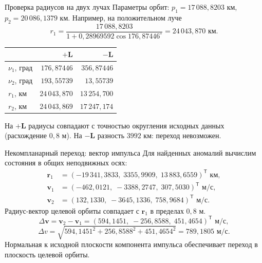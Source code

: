 \documentclass[11pt,aspectratio=169,t]{beamer}
\begin{document}
\begin{frame}{Проверка радиусов на двух лучах}
Параметры орбит:
$p_1=17\,088{,}8203$ км, $p_2=20\,086{,}1379$ км.
Например, на положительном луче
\[
r_1=\frac{17\,088{,}8203}{1+0{,}28969592\cos176{,}87446^\circ}
=24\,043{,}870\text{ км}.
\]
\centering
\renewcommand{\arraystretch}{1.0}
\begin{tabular}{@{}lrr@{}}
\toprule
 & $+\mathbf L$ & $-\mathbf L$\\\midrule
$\nu_1$, град & $176{,}87446$ & $356{,}87446$\\
$\nu_2$, град & $193{,}55739$ & $13{,}55739$\\
$r_1$, км & $24\,043{,}870$ & $13\,254{,}700$\\
$r_2$, км & $24\,043{,}869$ & $17\,247{,}174$\\\bottomrule
\end{tabular}\par\smallskip
\justifying
На $+\mathbf L$ радиусы совпадают с точностью округления исходных данных
(расхождение $0{,}8$ м). На $-\mathbf L$ разность $3992$ км: переход невозможен.
\end{frame}

\begin{frame}{Некомпланарный переход: вектор импульса}
Для найденных аномалий вычислим состояния в общих неподвижных осях:
\begin{align*}
\mathbf r_1&=(-19\,341{,}3833,\;3355{,}9909,\;13\,883{,}6559)^{\mathsf T}\text{ км},\\
\mathbf v_1&=(-462{,}0121,\;-3388{,}2747,\;307{,}5030)^{\mathsf T}\text{ м/с},\\
\mathbf v_2&=(132{,}1330,\;-3645{,}1336,\;758{,}9684)^{\mathsf T}\text{ м/с}.
\end{align*}
Радиус-вектор целевой орбиты совпадает с $\mathbf r_1$ в пределах $0{,}8$ м.
\[
\Delta\mathbf v=\mathbf v_2-\mathbf v_1
=(594{,}1451,\;-256{,}8588,\;451{,}4654)^{\mathsf T}\text{ м/с},
\]
\[
\Delta v=\sqrt{594{,}1451^2+256{,}8588^2+451{,}4654^2}
=789{,}1805\text{ м/с}.
\]
\justifying
Нормальная к исходной плоскости компонента импульса обеспечивает переход
в плоскость целевой орбиты.
\end{frame}
\end{document}
